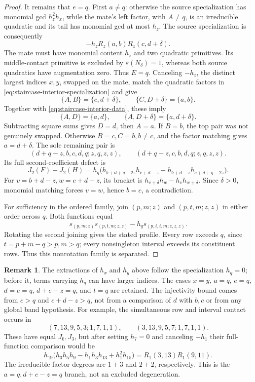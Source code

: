 \documentclass[11pt,a4paper]{amsart}
\numberwithin{equation}{section}
\theoremstyle{plain}
\theoremstyle{definition}
\newtheorem{remark}[theorem]{Remark}
\begin{document}
\begin{proof}
It remains that \(e=q\).  First \(a\ne q\): otherwise the source
specialization has monomial gcd \(h_z^2h_x\), while the mate's
left factor, with \(A\ne q\), is an irreducible quadratic and its
tail has monomial gcd at most \(h_z\).
The source specialization is consequently
\[
 -h_zR_z(a,b)R_z(c,d+\delta).
\]
The mate must have monomial content \(h_z\) and two quadratic
primitives.  Its middle-contact primitive is excluded by
\(\varepsilon(N_\delta)=1\), whereas both source quadratics have
augmentation zero.  Thus \(E=q\).  Canceling \(-h_z\), the
distinct largest indices \(x,y\), swapped on the mate, match the
quadratic factors in
\eqref{eq:staircase-interior-specialization} and give
\[
 \{A,B\}=\{c,d+\delta\},\qquad
 \{C,D+\delta\}=\{a,b\}.
\]
Together with \eqref{eq:staircase-interior-data}, these imply
\[
 \{A,D\}=\{a,d\},\qquad
 \{A,D+\delta\}=\{a,d+\delta\}.
\]
Subtracting square sums gives \(D=d\), then \(A=a\).
If \(B=b\), the top pair was not genuinely swapped.  Otherwise
\(B=c,C=b,b\ne c\), and the factor matching gives \(a=d+\delta\).
The sole remaining pair is
\[
 (d+q-z,b,c,d,q;z,q,z,z),\qquad
 (d+q-z,c,b,d,q;z,q,z,z).
\]
Its full second-coefficient defect is
\begin{equation}\label{eq:staircase-interior-final-defect}
 J_2(F)-J_2(H)=h_q\bigl(
 h_{b+d+q-2z}h_{c+d-z}-h_{b+d-z}h_{c+d+q-2z}\bigr).
\end{equation}
For \(v=b+d-z,w=c+d-z\), its bracket is
\(h_{v+\delta}h_w-h_vh_{w+\delta}\).  Since \(\delta>0\),
monomial matching forces \(v=w\), hence \(b=c\), a contradiction.

For sufficiency in the ordered family, join \((p,m;z)\) and
\((p,t,m;z,z)\) in either order across \(q\).
Both functions equal
\[
 s_{(p,m;z)}s_{(p,t,m;z,z)}
 -h_qs_{(p,t,t,m;z,z,z)}.
\]
Rotating the second joining gives the stated profile.
Every row exceeds \(q\), since \(t=p+m-q>p,m>q\);
every nonsingleton interval exceeds its constituent rows.
Thus this nonrotation family is separated.
\end{proof}

\begin{remark}
The extractions of \(h_x\) and \(h_y\) above follow the specialization
\(h_q=0\); before it, terms carrying \(h_q\) can have larger indices.
The cases \(x=y\), \(a=q\), \(e=q\), \(d=e=q\),
\(d+e-z=q\), and \(t=q\) are retained.  The injectivity bound
comes from \(c>q\) and \(c+d-z>q\), not from a comparison of
\(d\) with \(b,c\) or from any global band hypothesis.
For example, the simultaneous row and interval contact occurs in
\[
 (7,13,9,5,3;1,7,1,1),\qquad
 (3,13,9,5,7;1,7,1,1).
\]
These have equal \(J_0,J_3\), but after setting \(h_7=0\) and
canceling \(-h_1\) their full-function comparison would be
\[
 h_{19}\bigl(h_3h_5h_9-h_1h_3h_{13}+h_1^2h_{15}\bigr)
 =R_1(3,13)R_1(9,11).
\]
The irreducible factor degrees are \(1+3\) and \(2+2\), respectively.
This is the \(a=q,d+e-z=q\) branch, not an excluded degeneration.
\end{remark}
\end{document}

